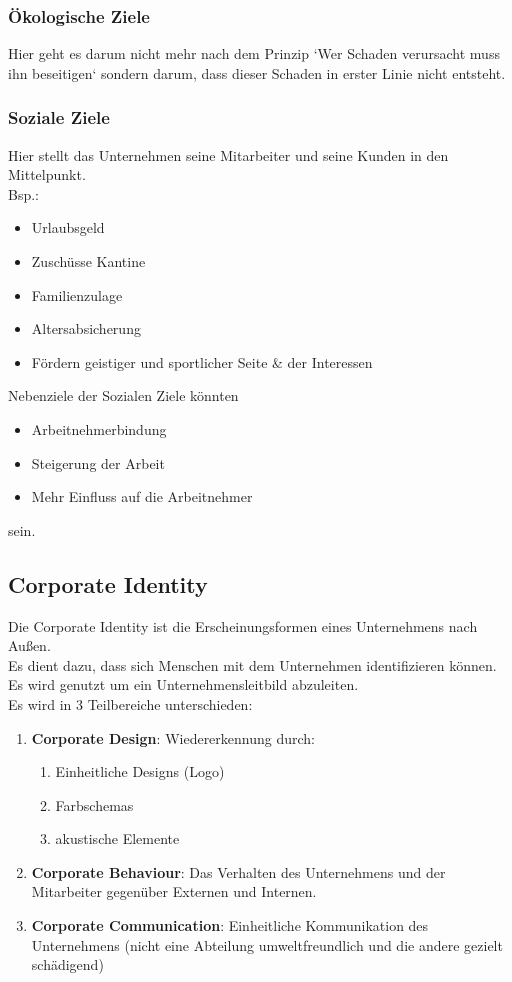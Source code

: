 \documentclass[asp1.tex]{subfiles}
\begin{document}
\subsubsection{Ökologische Ziele}
Hier geht es darum nicht mehr nach dem Prinzip `Wer Schaden verursacht muss ihn beseitigen` sondern darum, dass dieser Schaden in erster Linie nicht entsteht.

\subsubsection{Soziale Ziele}
Hier stellt das Unternehmen seine Mitarbeiter und seine Kunden in den Mittelpunkt. \\
Bsp.:
\begin{itemize}
    \item Urlaubsgeld
    \item Zuschüsse  Kantine
    \item Familienzulage
    \item Altersabsicherung
    \item Fördern geistiger und sportlicher Seite \& der Interessen
\end{itemize}
Nebenziele der Sozialen Ziele könnten
\begin{itemize}
    \item Arbeitnehmerbindung
    \item Steigerung der Arbeit
    \item Mehr Einfluss auf die Arbeitnehmer
\end{itemize}
sein.

\subsection{Corporate Identity}
Die Corporate Identity ist die Erscheinungsformen eines Unternehmens nach Außen. \\
Es dient dazu, dass sich Menschen mit dem Unternehmen identifizieren können. \\
Es wird genutzt um ein Unternehmensleitbild abzuleiten. \\
Es wird in 3 Teilbereiche unterschieden:
\begin{enumerate}
    \item \textbf{Corporate Design}: Wiedererkennung durch:
          \begin{enumerate}
              \item Einheitliche Designs (Logo)
              \item Farbschemas
              \item akustische Elemente
          \end{enumerate}
    \item \textbf{Corporate Behaviour}: Das Verhalten des Unternehmens und der Mitarbeiter  gegenüber Externen und Internen.
    \item \textbf{Corporate Communication}: Einheitliche Kommunikation des Unternehmens (nicht eine Abteilung umweltfreundlich und die andere gezielt schädigend)
\end{enumerate}
\end{document}
